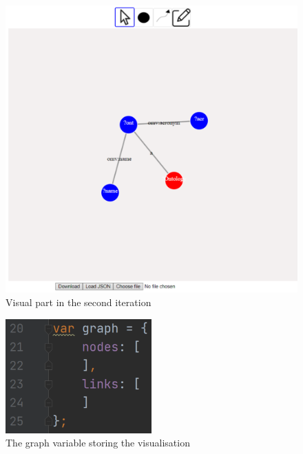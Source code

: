 \begin{figure}[H]
    \centering
    \includegraphics[width=1\textwidth]{figures/second-iteration-ui.pdf}
    \caption{Visual part in the second iteration}
    \label{fig:second-iteration-ui}
\end{figure}

\begin{figure}[H]
    \centering
    \includegraphics[width=0.5\textwidth]{figures/picture-graph.pdf}
    \caption{The graph variable storing the visualisation}
    \label{fig:graph}
\end{figure}


